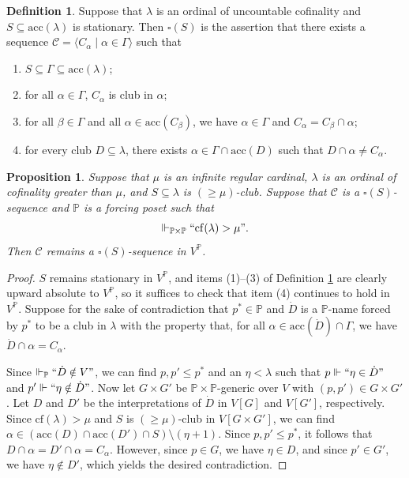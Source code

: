 \documentclass{amsart}
\numberwithin{theorem}{section}
\newtheorem{proposition}[theorem]{Proposition}
\theoremstyle{definition}
\newtheorem{definition}[theorem]{Definition}
\newcommand{\cf}{\mathrm{cf}}
\newcommand{\bb}{\mathbb}
\newcommand{\acc}{\mathrm{acc}}
\newcommand{\mc}{\mathcal}
\renewcommand{\P}{\bb{P}}
\begin{document}
\begin{definition} \label{def: partial_square}
  Suppose that $\lambda$ is an ordinal of uncountable cofinality and $S \subseteq \acc(\lambda)$ 
  is stationary. Then $\square(S)$ is the assertion that there exists a sequence 
  $\mc{C} = \langle C_\alpha \mid \alpha \in \Gamma \rangle$ such that
  \begin{enumerate}
    \item $S \subseteq \Gamma \subseteq \acc(\lambda)$;
    \item for all $\alpha \in \Gamma$, $C_\alpha$ is club in $\alpha$;
    \item for all $\beta \in \Gamma$ and all $\alpha \in \acc(C_\beta)$, we have 
    $\alpha \in \Gamma$ and $C_\alpha = C_\beta \cap \alpha$;
    \item for every club $D \subseteq \lambda$, there exists $\alpha \in 
    \Gamma \cap \acc(D)$ such that $D \cap \alpha \neq C_\alpha$.
  \end{enumerate}
\end{definition}

\begin{proposition} \label{prop: product_thread}
  Suppose that $\mu$ is an infinite regular cardinal, $\lambda$ is an ordinal of cofinality 
  greater than $\mu$, and $S \subseteq \lambda$ is $({\geq} \mu)$-club. Suppose that 
  $\mc{C}$ is a $\square(S)$-sequence and $\P$ is a forcing poset such that 
  \[
    \Vdash_{\P \times \P} ``\cf(\lambda) > \mu".
  \]
  Then $\mc{C}$ remains a $\square(S)$-sequence in $V^{\P}$.
\end{proposition}

\begin{proof}
  $S$ remains stationary in $V^{\P}$, and items (1)--(3) of Definition \ref{def: partial_square} 
  are clearly upward absolute to $V^{\P}$, so it suffices to check that item (4) continues to 
  hold in $V^{\P}$. Suppose for the sake of contradiction that $p^* \in \P$ and 
  $\dot{D}$ is a $\P$-name forced by $p^*$
  to be a club in $\lambda$ with the property that, for all $\alpha \in \acc(\dot{D}) \cap 
  \Gamma$, we have $\dot{D} \cap \alpha = C_\alpha$.
  
  Since $\Vdash_{\P} ``\dot{D} \notin V"$, we can find $p, p' \leq p^*$ and an $\eta < \lambda$ 
  such that $p \Vdash ``\eta \in \dot{D}"$ and $p' \Vdash ``\eta \notin \dot{D}"$. 
  Now let $G \times G'$ be $\P \times \P$-generic over $V$ with $(p,p') \in G \times G'$. 
  Let $D$ and $D'$ be the interpretations of $\dot{D}$ in $V[G]$ and $V[G']$, respectively. 
  Since $\cf(\lambda) > \mu$ and $S$ is $(\geq \mu)$-club in $V[G \times G']$, we can find 
  $\alpha \in (\acc(D) \cap \acc(D') \cap S) \setminus (\eta + 1)$. Since $p,p' \leq p^*$, 
  it follows that $D \cap \alpha = D' \cap \alpha = C_\alpha$. However, since $p \in G$, 
  we have $\eta \in D$, and since $p' \in G'$, we have $\eta \notin D'$, which yields the 
  desired contradiction.
\end{proof}
\end{document}
